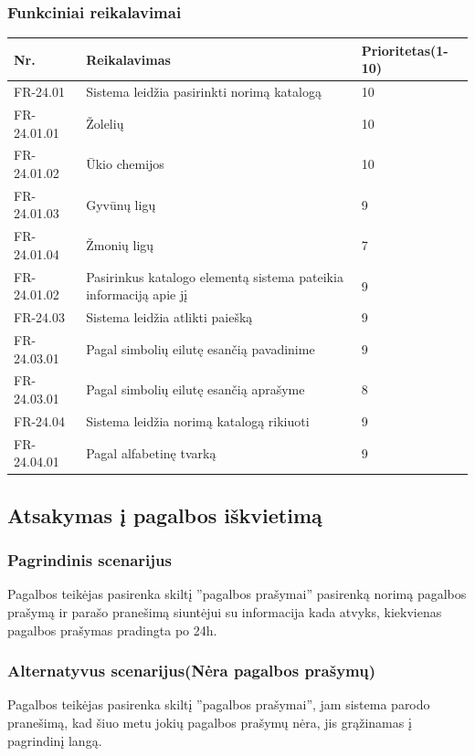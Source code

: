 \documentclass[oneside]{VUMIFPSkursinis}
\begin{document}
	\subsubsection{Funkciniai reikalavimai}
	\begin{table}[htbp]
		\begin{tabularx}{1\textwidth}{ |P{2.5cm}|X|P{3cm }| }  \hline
			Nr. & Reikalavimas & Prioritetas(1-10) \\ \hline
			FR-24.01 & Sistema leidžia pasirinkti norimą katalogą & 10 \\ \hline
			FR-24.01.01 & Žolelių & 10 \\ \hline
			FR-24.01.02 & Ūkio chemijos & 10 \\ \hline
			FR-24.01.03 & Gyvūnų ligų & 9 \\ \hline
			FR-24.01.04 & Žmonių ligų & 7 \\ \hline
			FR-24.01.02 & Pasirinkus katalogo elementą sistema pateikia informaciją apie jį & 9 \\ \hline
			FR-24.03 & Sistema leidžia atlikti paiešką  & 9 \\ \hline
			FR-24.03.01 & Pagal simbolių eilutę esančią pavadinime & 9 \\ \hline
			FR-24.03.01 & Pagal simbolių eilutę esančią aprašyme & 8 \\ \hline
			FR-24.04 & Sistema leidžia norimą katalogą rikiuoti & 9 \\ \hline
			FR-24.04.01 & Pagal alfabetinę tvarką  & 9 \\ \hline
		\end{tabularx}
	\end{table}
	
	\subsection{Atsakymas į pagalbos iškvietimą}
	\subsubsection{Pagrindinis scenarijus}
	Pagalbos teikėjas pasirenka skiltį ''pagalbos prašymai'' pasirenką norimą pagalbos prašymą ir parašo pranešimą siuntėjui su informacija kada atvyks, kiekvienas pagalbos prašymas pradingta po 24h.
	\subsubsection{Alternatyvus scenarijus(Nėra pagalbos prašymų)}
	Pagalbos teikėjas pasirenka skiltį ''pagalbos prašymai'', jam sistema parodo pranešimą, kad šiuo metu jokių pagalbos prašymų nėra, jis grąžinamas į pagrindinį langą.
\end{document}
